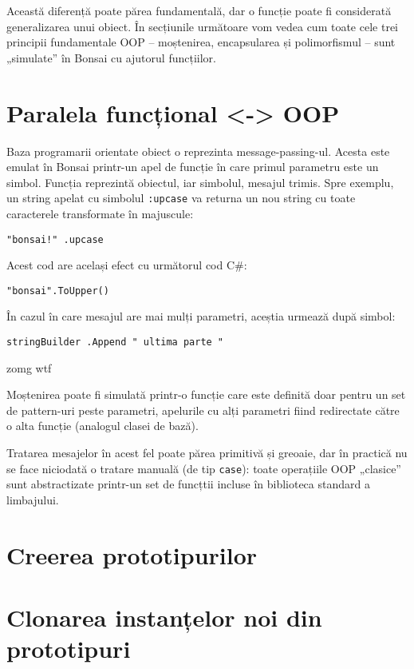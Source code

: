 \documentclass[12pt,a4paper]{memoir}
\begin{document}
Această diferență poate părea fundamentală, dar o funcție poate fi considerată generalizarea unui obiect. În secțiunile următoare vom vedea cum toate cele trei principii fundamentale OOP – moștenirea, encapsularea și polimorfismul – sunt „simulate” în Bonsai cu ajutorul funcțiilor.

\section{Paralela funcțional <-> OOP}

Baza programarii orientate obiect o reprezinta message-passing-ul. Acesta este emulat în Bonsai printr-un apel de funcție în care primul parametru este un simbol. Funcția reprezintă obiectul, iar simbolul, mesajul trimis. Spre exemplu, un string apelat cu simbolul \texttt{:upcase} va returna un nou string cu toate caracterele transformate în majuscule:
\begin{Verbatim}
"bonsai!" .upcase
\end{Verbatim}
Acest cod are același efect cu următorul cod C\#:
\begin{Verbatim}
"bonsai".ToUpper()
\end{Verbatim}
În cazul în care mesajul are mai mulți parametri, aceștia urmează după simbol:
\begin{Verbatim}
stringBuilder .Append " ultima parte "
\end{Verbatim}

\begin{shaded}
zomg wtf
\end{shaded}


Moștenirea poate fi simulată printr-o funcție care este definită doar pentru un set de pattern-uri peste parametri, apelurile cu alți parametri fiind redirectate către o alta funcție (analogul clasei de bază).

Tratarea mesajelor în acest fel poate părea primitivă și greoaie, dar în practică nu se face niciodată o tratare manuală (de tip \texttt{case}): toate operațiile OOP „clasice” sunt abstractizate printr-un set de funcțtii incluse în biblioteca standard a limbajului.

\section{Creerea prototipurilor}

\section{Clonarea instanțelor noi din prototipuri}
\end{document}
